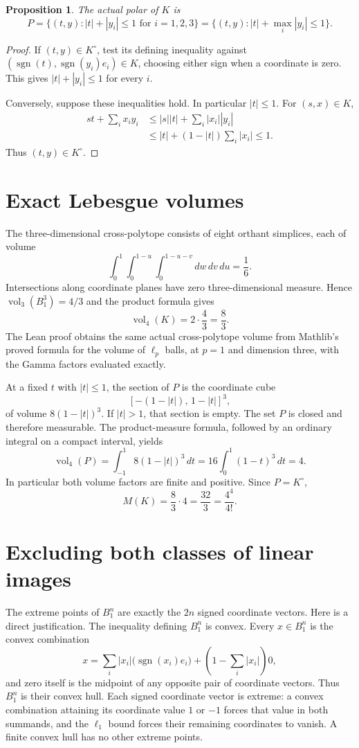 \documentclass[11pt]{article}
\newcommand{\vol}{\operatorname{vol}}
\newtheorem{proposition}{Proposition}
\begin{document}
\begin{proposition}
The actual polar of $K$ is
\[
 P=\{(t,y):|t|+|y_i|\leq1\text{ for }i=1,2,3\}
   =\{(t,y):|t|+\max_i|y_i|\leq1\}.
\]
\end{proposition}
\begin{proof}
If $(t,y)\in K^\circ$, test its defining inequality against
$(\operatorname{sgn}(t),\operatorname{sgn}(y_i)e_i)\in K$, choosing either
sign when a coordinate is zero. This gives $|t|+|y_i|\leq1$ for every $i$.

Conversely, suppose these inequalities hold. In particular $|t|\leq1$.
For $(s,x)\in K$,
\begin{align*}
 st+\sum_i x_i y_i
 &\leq |s||t|+\sum_i|x_i||y_i|\\
 &\leq |t|+(1-|t|)\sum_i|x_i|\leq1.
\end{align*}
Thus $(t,y)\in K^\circ$.
\end{proof}

\section{Exact Lebesgue volumes}
The three-dimensional cross-polytope consists of eight orthant simplices,
each of volume
\[
 \int_0^1\int_0^{1-u}\int_0^{1-u-v}dw\,dv\,du=\frac16.
\]
Intersections along coordinate planes have zero three-dimensional measure.
Hence $\vol_3(B_1^3)=4/3$ and the product formula gives
\[
 \vol_4(K)=2\cdot\frac43=\frac83.
\]
The Lean proof obtains the same actual cross-polytope volume from Mathlib's
proved formula for the volume of $\ell_p$ balls, at $p=1$ and dimension
three, with the Gamma factors evaluated exactly.

At a fixed $t$ with $|t|\leq1$, the section of $P$ is the coordinate cube
\[
 [-(1-|t|),\,1-|t|]^3,
\]
of volume $8(1-|t|)^3$. If $|t|>1$, that section is empty.
The set $P$ is closed and therefore measurable. The product-measure
formula, followed by an ordinary integral on a compact interval, yields
\[
 \vol_4(P)=\int_{-1}^1 8(1-|t|)^3\,dt
          =16\int_0^1(1-t)^3\,dt=4.
\]
In particular both volume factors are finite and positive. Since $P=K^\circ$,
\[
 \boxed{\ M(K)=\frac83\cdot4=\frac{32}{3}
                   =\frac{4^4}{4!}.\ }
\]

\section{Excluding both classes of linear images}
The extreme points of $B_1^n$ are exactly the $2n$ signed coordinate
vectors. Here is a direct justification. The inequality defining $B_1^n$
is convex. Every $x\in B_1^n$ is the convex combination
\[
 x=\sum_i |x_i|\bigl(\operatorname{sgn}(x_i)e_i\bigr)
        +\left(1-\sum_i|x_i|\right)0,
\]
and zero itself is the midpoint of any opposite pair of coordinate vectors.
Thus $B_1^n$ is their convex hull. Each signed coordinate vector is extreme:
a convex combination attaining its coordinate value $1$ or $-1$ forces
that value in both summands, and the $\ell_1$ bound forces their remaining
coordinates to vanish. A finite convex hull has no other extreme points.
\end{document}
